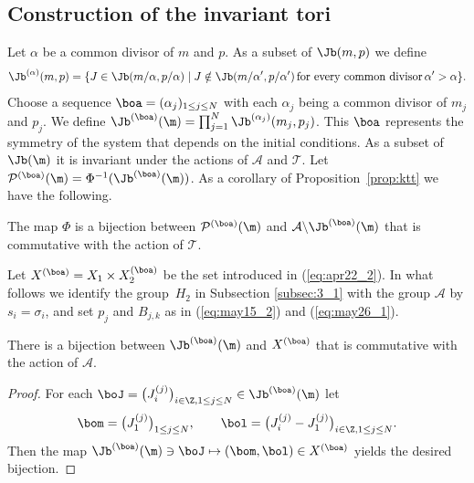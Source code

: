 \subsection{Construction of the invariant tori}\label{subsec:4_4}
Let $\alpha$ be a common divisor of $m$ and $p$.
As a subset of $\Jb (m,p)$ %
we def\/ine
\begin{displaymath}
{\Jb}^{(\alpha)} (m,p) = \{
J \in {\Jb} (m/\alpha,p/\alpha) \mid
J \notin {\Jb} (m/\alpha',p/\alpha') \, \mbox{for every common divisor} \, \alpha' > \alpha \}.
\end{displaymath}
Choose a sequence $\boa = (\alpha_j)_{1 \leq j \leq N}$ with
each $\alpha_j$ being a common divisor of $m_j$ and $p_j$.
We def\/ine
$\Jb^{(\boa)} (\m) = \prod_{j=1}^N {\Jb}^{(\alpha_j)} (m_j,p_j)$.
%
This $\boa$ represents the symmetry of the system that depends on the initial conditions.
%
As a subset of $\Jb (\m)$ it is invariant under the actions of ${\mathcal A}$ and ${\mathcal T}$.
{Let
${\mathcal P}^{(\boa)}(\m) = \Phi^{-1}(\Jb^{(\boa)} (\m))$.}
As a corollary of Proposition~\ref{prop:ktt} we have the following.
\begin{corollary}\label{coro:ktt}
The map $\Phi$ is a bijection
between ${\mathcal P}^{(\boa)}(\m)$ and ${\mathcal A} \backslash
\Jb^{(\boa)} (\m)$
that is commutative with the action of ${\mathcal T}$.
\end{corollary}

Let $X^{(\boa)} = X_1 \times X_2^{(\boa)}$  be the set introduced in (\ref{eq:apr22_2}).
In what follows
we identify the group~$H_2$ in Subsection \ref{subsec:3_1} with the group ${\mathcal A}$ by $s_i = \sigma_i$,
and set $p_j$ and $B_{j,k}$ as in (\ref{eq:may15_2}) and (\ref{eq:may26_1}).

\begin{lemma}\label{lem:may14_1}
There is a bijection between $\Jb^{(\boa)} (\m)$ and $X^{(\boa)}$ that is commutative with the action of ${\mathcal A}$.
\end{lemma}

\begin{proof}
For each {$\boJ = \big(J^{(j)}_i\big)_{i \in \Z, 1 \leq j \leq N} \in \Jb^{(\boa)} (\m)$}
let
\begin{displaymath}
\bom = \big(J^{(j)}_1\big)_{1 \leq j \leq N}, \qquad \bol = \big(J^{(j)}_i-J^{(j)}_1\big)_{i \in \Z, 1 \leq j \leq N}.
\end{displaymath}
Then the map $\Jb^{(\boa)} (\m) \ni \boJ \mapsto (\bom, \bol) \in X^{(\boa)}$ yields the desired bijection.
\end{proof}



